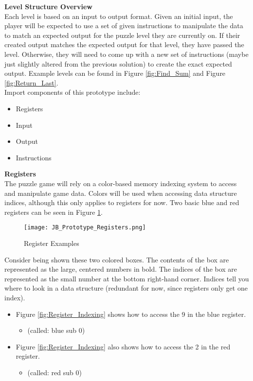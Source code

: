 \textbf{Level Structure Overview}\\

Each level is based on an input to output format. Given an initial input, the player
will be expected to use a set of given instructions to manipulate the data to
match an expected output for the puzzle level they are currently on. If their
created output matches the expected output for that level, they have passed the level.
Otherwise, they will need to come up with a new set of instructions (maybe just
slightly altered from the previous solution) to create the exact expected output.
Example levels can be found in Figure \ref{fig:Find_Sum} and Figure \ref{fig:Return_Last}.\\

Import components of this prototype include:
\begin{itemize}
  \item Registers
  \item Input
  \item Output
  \item Instructions
\end{itemize}

\textbf{Registers}\\

The puzzle game will rely on a color-based memory indexing system to access and
manipulate game data. Colors will be used when accessing data structure indices,
although this only applies to registers for now. Two basic blue and red registers
can be seen in Figure \ref{fig:Register_Examples}.

\begin{figure}[!hb]
  \caption{Register Examples}
  \label{fig:Register_Examples}
  \centering
  \texttt{[image: JB\_Prototype\_Registers.png]}
\end{figure}

Consider being shown these two colored boxes. The contents of the box are represented
as the large, centered numbers in bold. The indices of the box are represented as the
small number at the bottom right-hand corner. Indices tell you where to look in a
data structure (redundant for now, since registers only get one index).

\begin{itemize}
  \item Figure \ref{fig:Register_Indexing} shows how to access the 9 in the blue register.
  \begin{itemize}
    \item (called: blue sub 0)
  \end{itemize}
  \item Figure \ref{fig:Register_Indexing} also shows how to access the 2 in the red register.
  \begin{itemize}
    \item (called: red sub 0)
  \end{itemize}
\end{itemize}

